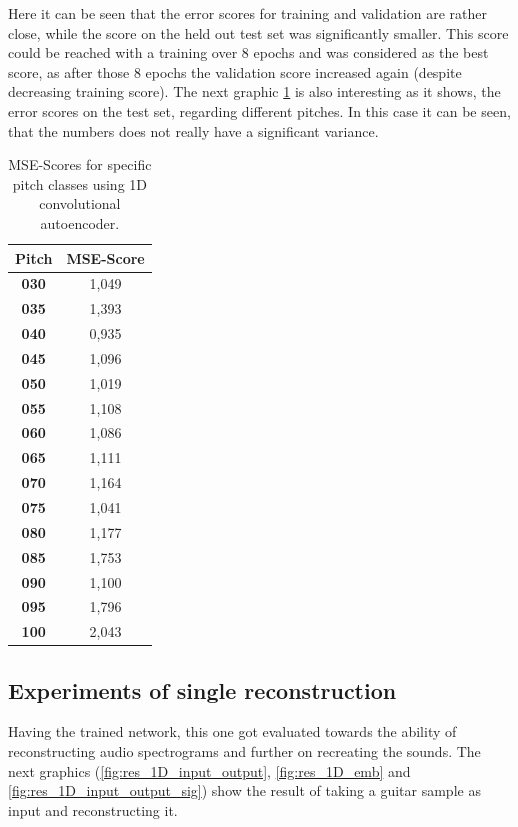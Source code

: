 Here it can be seen that the error scores for training and validation are rather close, while the score on the held out test set was significantly smaller. This score could be reached with a training over 8 epochs and was considered as the best score, as after those 8 epochs the validation score increased again (despite decreasing training score). The next graphic \ref{tab:res_scores_1D_pitch} is also interesting as it shows, the error scores on the test set, regarding different pitches. In this case it can be seen, that the numbers does not really have a significant variance.

\begin{table}[htb!]
    \centering
    \begin{tabular}{|c|c|}
        \hline
         \textbf{Pitch} & \textbf{MSE-Score} \\
         \hline
         \textbf{030} & 1,049\\
         \hline
         \textbf{035} & 1,393\\
         \hline
         \textbf{040} & 0,935\\
         \hline
         \textbf{045} & 1,096\\
         \hline
         \textbf{050} & 1,019\\
         \hline
         \textbf{055} & 1,108\\
         \hline
         \textbf{060} & 1,086\\
         \hline
         \textbf{065} & 1,111\\
         \hline
         \textbf{070} & 1,164\\
         \hline
         \textbf{075} & 1,041\\
         \hline
         \textbf{080} & 1,177\\
         \hline
         \textbf{085} & 1,753\\
         \hline
         \textbf{090} & 1,100\\
         \hline
         \textbf{095} & 1,796\\
         \hline
         \textbf{100} & 2,043\\
         \hline
    \end{tabular}
    \caption{MSE-Scores for specific pitch classes using 1D convolutional autoencoder.}
    \label{tab:res_scores_1D_pitch}
\end{table}

\subsection{Experiments of single reconstruction}
Having the trained network, this one got evaluated towards the ability of reconstructing audio spectrograms and further on recreating the sounds. The next graphics (\ref{fig:res_1D_input_output}, \ref{fig:res_1D_emb} and \ref{fig:res_1D_input_output_sig}) show the result of taking a guitar sample as input and reconstructing it. 

